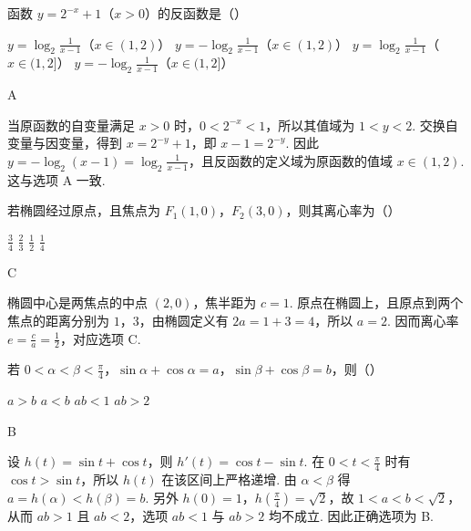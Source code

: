 \begin{problem}
函数 \(y = 2^{-x} + 1\)（\(x > 0\)）的反函数是（\quad）

\choices
    {\( y = \log_2\frac{1}{x - 1} \)（\(x \in (1,2)\)）}
    {\(y = -\log_2\frac{1}{x - 1}\)（\(x \in (1,2)\)）}
    {\( y = \log_2\frac{1}{x - 1} \)（\(x \in (1,2]\)）}
    {\( y = -\log_2\frac{1}{x - 1} \)（\(x \in (1,2]\)）}
\end{problem}

\begin{answer}
A
\end{answer}

\begin{solution}
当原函数的自变量满足 \(x>0\) 时，\(0<2^{-x}<1\)，所以其值域为 \(1<y<2\). 交换自变量与因变量，得到 \(x=2^{-y}+1\)，即 \(x-1=2^{-y}\). 因此
\(y=-\log_2(x-1)=\log_2\frac{1}{x-1}\)，且反函数的定义域为原函数的值域 \(x\in(1,2)\). 这与选项 A 一致.
\end{solution}

\begin{problem}
若椭圆经过原点，且焦点为 \(F_{1}(1,0)\)，\(F_{2}(3,0)\)，则其离心率为（\quad）

\choices
    {\(\frac{3}{4}\)}
    {\(\frac{2}{3}\)}
    {\(\frac{1}{2}\)}
    {\(\frac{1}{4}\)}
\end{problem}

\begin{answer}
C
\end{answer}

\begin{solution}
椭圆中心是两焦点的中点 \((2,0)\)，焦半距为 \(c=1\). 原点在椭圆上，且原点到两个焦点的距离分别为 \(1\)，\(3\)，由椭圆定义有
\(2a=1+3=4\)，所以 \(a=2\). 因而离心率 \(e=\frac{c}{a}=\frac{1}{2}\)，对应选项 C.
\end{solution}

\begin{problem}
若 \(0 < \alpha < \beta < \frac{\pi}{4}\)，\(\sin \alpha + \cos \alpha = a\)，\(\sin \beta + \cos \beta = b\)，则（\quad）

\choices
    {\(a > b\)}
    {\(a < b\)}
    {\(ab < 1\)}
    {\(ab > 2\)}
\end{problem}

\begin{answer}
B
\end{answer}

\begin{solution}
设 \(h(t)=\sin t+\cos t\)，则 \(h'(t)=\cos t-\sin t\). 在 \(0<t<\frac{\pi}{4}\) 时有 \(\cos t>\sin t\)，所以 \(h(t)\) 在该区间上严格递增. 由 \(\alpha<\beta\) 得 \(a=h(\alpha)<h(\beta)=b\). 另外 \(h(0)=1\)，\(h\left(\frac{\pi}{4}\right)=\sqrt{2}\)，故 \(1<a<b<\sqrt{2}\)，从而 \(ab>1\) 且 \(ab<2\)，选项 \(ab<1\) 与 \(ab>2\) 均不成立. 因此正确选项为 B.
\end{solution}

